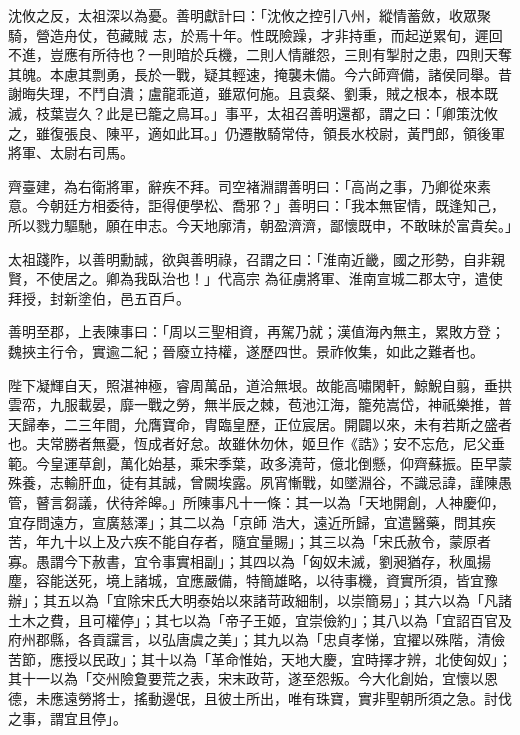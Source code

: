 \begin{pinyinscope}
 沈攸之反，太祖深以為憂。善明獻計曰：「沈攸之控引八州，縱情蓄斂，收眾聚騎，營造舟仗，苞藏賊
 志，於焉十年。性既險躁，才非持重，而起逆累旬，遲回不進，豈應有所待也？一則暗於兵機，二則人情離怨，三則有掣肘之患，四則天奪其魄。本慮其剽勇，長於一戰，疑其輕速，掩襲未備。今六師齊備，諸侯同舉。昔謝晦失理，不鬥自潰；盧龍乖道，雖眾何施。且袁粲、劉秉，賊之根本，根本既滅，枝葉豈久？此是已籠之鳥耳。」事平，太祖召善明還都，謂之曰：「卿策沈攸之，雖復張良、陳平，適如此耳。」仍遷散騎常侍，領長水校尉，黃門郎，領後軍將軍、太尉右司馬。



 齊臺建，為右衛將軍，辭疾不拜。司空褚淵謂善明曰：「高尚之事，乃卿從來素意。今朝廷方相委待，詎得便學松、喬邪？」善明曰：「我本無宦情，既逢知己，所以戮力驅馳，願在申志。今天地廓清，朝盈濟濟，鄙懷既申，不敢昧於富貴矣。」



 太祖踐阼，以善明勳誠，欲與善明祿，召謂之曰：「淮南近畿，國之形勢，自非親賢，不使居之。卿為我臥治也！」代高宗
 為征虜將軍、淮南宣城二郡太守，遣使拜授，封新塗伯，邑五百戶。



 善明至郡，上表陳事曰：「周以三聖相資，再駕乃就；漢值海內無主，累敗方登；魏挾主行令，實逾二紀；晉廢立持權，遂歷四世。景祚攸集，如此之難者也。



 陛下凝輝自天，照湛神極，睿周萬品，道洽無垠。故能高嘯閑軒，鯨鯢自翦，垂拱雲帟，九服載晏，靡一戰之勞，無半辰之棘，苞池江海，籠苑嵩岱，神祇樂推，普天歸奉，二三年間，允膺寶命，胄臨皇歷，正位宸居。開闢以來，未有若斯之盛者也。夫常勝者無憂，恆成者好怠。故雖休勿休，姬旦作《誥》；安不忘危，尼父垂範。今皇運草創，萬化始基，乘宋季葉，政多澆苛，億北倒懸，仰齊蘇振。臣早蒙殊養，志輸肝血，徒有其誠，曾闕埃露。夙宵慚戰，如墜淵谷，不識忌諱，謹陳愚管，瞽言芻議，伏待斧皞。」所陳事凡十一條：其一以為「天地開創，人神慶仰，宜存問遠方，宣廣慈澤」；其二以為「京師
 浩大，遠近所歸，宜遣醫藥，問其疾苦，年九十以上及六疾不能自存者，隨宜量賜」；其三以為「宋氏赦令，蒙原者寡。愚謂今下赦書，宜令事實相副」；其四以為「匈奴未滅，劉昶猶存，秋風揚塵，容能送死，境上諸城，宜應嚴備，特簡雄略，以待事機，資實所須，皆宜豫辦」；其五以為「宜除宋氏大明泰始以來諸苛政細制，以崇簡易」；其六以為「凡諸土木之費，且可權停」；其七以為「帝子王姬，宜崇儉約」；其八以為「宜詔百官及府州郡縣，各貢讜言，以弘唐虞之美」；其九以為「忠貞孝悌，宜擢以殊階，清儉苦節，應授以民政」；其十以為「革命惟始，天地大慶，宜時擇才辨，北使匈奴」；其十一以為「交州險夐要荒之表，宋末政苛，遂至怨叛。今大化創始，宜懷以恩德，未應遠勞將士，搖動邊氓，且彼土所出，唯有珠寶，實非聖朝所須之急。討伐之事，謂宜且停」。




\end{pinyinscope}
